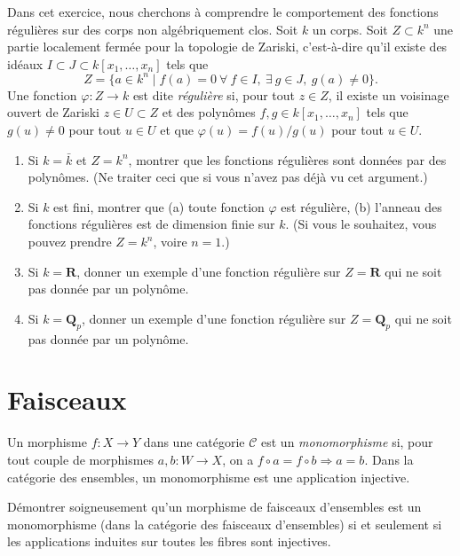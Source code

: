 \begin{exercise}
\label{exercise-regular-functions}
Dans cet exercice, nous cherchons à comprendre le comportement des fonctions régulières
sur des corps non algébriquement clos. Soit $k$ un corps.
Soit $Z \subset k^n$ une partie localement fermée pour la topologie de Zariski, c'est-à-dire qu'il
existe des idéaux $I \subset J \subset k[x_1, \ldots, x_n]$ tels que
$$
Z = \{a \in k^n \mid
f(a) = 0\ \forall\ f \in I,\ \exists\ g \in J,\ g(a) \not = 0\}.
$$
Une fonction $\varphi : Z \to k$ est dite {\it régulière} si, pour tout
$z \in Z$, il existe un voisinage ouvert de Zariski $z \in U \subset Z$
et des polynômes $f, g \in k[x_1, \ldots, x_n]$ tels que
$g(u) \not = 0$ pour tout $u \in U$ et que
$\varphi(u) = f(u)/g(u)$ pour tout $u \in U$.
\begin{enumerate}
\item Si $k = \bar k$ et $Z = k^n$, montrer que les fonctions régulières sont
données par des polynômes. (Ne traiter ceci que si vous n'avez pas déjà vu cet
argument.)
\item Si $k$ est fini, montrer que (a) toute fonction $\varphi$ est régulière,
(b) l'anneau des fonctions régulières est de dimension finie sur $k$.
(Si vous le souhaitez, vous pouvez prendre $Z = k^n$, voire $n = 1$.)
\item Si $k = \mathbf{R}$, donner un exemple d'une fonction régulière sur
$Z = \mathbf{R}$ qui ne soit pas donnée par un polynôme.
\item Si $k = \mathbf{Q}_p$, donner un exemple d'une fonction régulière sur
$Z = \mathbf{Q}_p$ qui ne soit pas donnée par un polynôme.
\end{enumerate}
\end{exercise}






\section{Faisceaux}
\label{section-sheaves}

\noindent
Un morphisme $f : X \to Y$ dans une catégorie $\mathcal{C}$ est un {\it monomorphisme}
si, pour tout couple de morphismes $a, b : W \to X$, on a
$f \circ a = f \circ b \Rightarrow a = b$. Dans la catégorie
des ensembles, un monomorphisme est une application injective.

\begin{exercise}
\label{exercise-mono-sheaves-sets}
Démontrer soigneusement qu'un morphisme de faisceaux d'ensembles est un monomorphisme
(dans la catégorie des faisceaux d'ensembles) si et seulement si les applications induites
sur toutes les fibres sont injectives.
\end{exercise}

